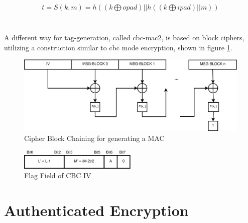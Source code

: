 \begin{align}
 t = S(k, m) = h((k \bigoplus opad) || h((k \bigoplus ipad) || m)) 
\end{align}
\\
\\
A different way for tag-generation, called \gls{cbc}-\gls{mac2}, is based on block ciphers, utilizing a construction similar to \gls{cbc} mode encryption,
shown in figure \ref{fig:cbc_MAC}. 

\begin{figure}\label{cbcMAC}
    \centering
    \includegraphics[width=1\textwidth]{figures/CBCMac.eps}
    \caption{Cipher Block Chaining for generating a MAC}
    \label{fig:cbc_MAC}
\end{figure}

\begin{figure}\label{cbcMACFlags}
    \centering
    \includegraphics[width=0.5\textwidth]{figures/CBCIVFlags.eps}
    \caption{Flag Field of CBC IV}
    \label{fig:cbc_Flags}
\end{figure}

\section{Authenticated Encryption}\label{authEncrypt}

